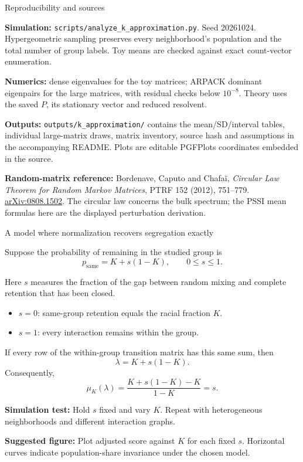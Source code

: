 \documentclass[aspectratio=169,10pt]{beamer}
\begin{document}
\begin{frame}{Reproducibility and sources}
\small

\textbf{Simulation:} \texttt{scripts/analyze\_k\_approximation.py}. Seed 20261024. Hypergeometric sampling preserves every neighborhood's population and the total number of group labels. Toy means are checked against exact count-vector enumeration.
\medskip

\textbf{Numerics:} dense eigenvalues for the toy matrices; ARPACK dominant eigenpairs for the large matrices, with residual checks below $10^{-8}$. Theory uses the saved $P$, its stationary vector and reduced resolvent.
\medskip

\textbf{Outputs:} \texttt{outputs/k\_approximation/} contains the mean/SD/interval tables, individual large-matrix draws, matrix inventory, source hash and assumptions in the accompanying README. Plots are editable PGFPlots coordinates embedded in the source.
\medskip

\textbf{Random-matrix reference:} Bordenave, Caputo and Chafa\"i, \emph{Circular Law Theorem for Random Markov Matrices}, PTRF 152 (2012), 751--779. \href{https://arxiv.org/abs/0808.1502}{arXiv:0808.1502}. The circular law concerns the bulk spectrum; the PSSI mean formulas here are the displayed perturbation derivation.

\end{frame}

\begin{frame}[shrink=0]{A model where normalization recovers segregation exactly}
\small

Suppose the probability of remaining in the studied group is
\[
    p_{\mathrm{same}}=K+s(1-K),
    \qquad 0\leq s\leq1.
\]

Here $s$ measures the fraction of the gap between random mixing
and complete retention that has been closed.

\begin{itemize}
    \item $s=0$: same-group retention equals the racial fraction $K$.
    \item $s=1$: every interaction remains within the group.
\end{itemize}

If every row of the within-group transition matrix has this
same sum, then
\[
    \lambda=K+s(1-K).
\]
Consequently,
\[
    \boxed{
    \mu_K(\lambda)
      =\frac{K+s(1-K)-K}{1-K}
      =s}.
\]

\textbf{Simulation test:}
Hold $s$ fixed and vary $K$. Repeat with heterogeneous
neighborhoods and different interaction graphs.

\medskip
\textbf{Suggested figure:}
Plot adjusted score against $K$ for each fixed $s$.
Horizontal curves indicate population-share invariance
under the chosen model.

\end{frame}
\end{document}
